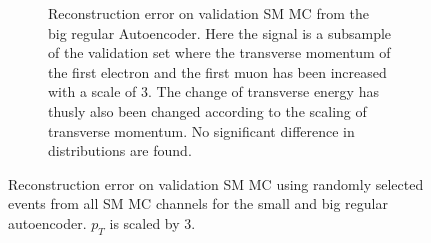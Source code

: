 \begin{figure}[h!]
\begin{subfigure}{.45\textwidth}
        \caption{Reconstruction error on validation SM MC from the big regular Autoencoder. Here the signal is a subsample of the validation 
        set where the transverse momentum of the first electron and the first muon has been increased with a scale of $3$. The change of transverse 
        energy has thusly also been changed according to the scaling of transverse momentum. No significant difference in distributions are found. }
        \label{fig:ae_big_pt_3}
    \end{subfigure}
    \hfill 
    \caption[AE | Reconstruction error $p_T$ altering of 3]{Reconstruction error on validation SM MC using randomly selected events from all SM MC channels for the small and big regular autoencoder. 
    $p_T$ is scaled by 3. }
    \label{fig:ae_big_small_pt_3}
\end{figure}

